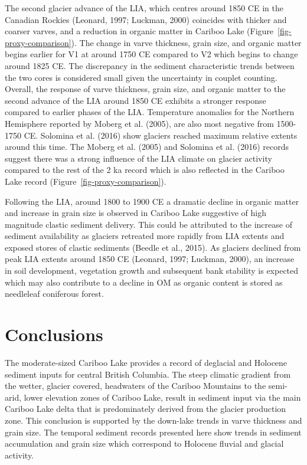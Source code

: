 \documentclass[
  letterpaper,
  DIV=11,
  numbers=noendperiod]{scrartcl}
\begin{document}
The second glacier advance of the LIA, which centres around 1850 CE in
the Canadian Rockies (Leonard, 1997; Luckman, 2000) coincides with
thicker and coarser varves, and a reduction in organic matter in Cariboo
Lake (Figure~\ref{fig-proxy-comparison}). The change in varve thickness,
grain size, and organic matter begins earlier for V1 at around 1750 CE
compared to V2 which begins to change around 1825 CE. The discrepancy in
the sediment characteristic trends between the two cores is considered
small given the uncertainty in couplet counting. Overall, the response
of varve thickness, grain size, and organic matter to the second advance
of the LIA around 1850 CE exhibits a stronger response compared to
earlier phases of the LIA. Temperature anomalies for the Northern
Hemisphere reported by Moberg et al. (2005), are also most negative from
1500-1750 CE. Solomina et al. (2016) show glaciers reached maximum
relative extents around this time. The Moberg et al. (2005) and Solomina
et al. (2016) records suggest there was a strong influence of the LIA
climate on glacier activity compared to the rest of the 2 ka record
which is also reflected in the Cariboo Lake record
(Figure~\ref{fig-proxy-comparison}).

Following the LIA, around 1800 to 1900 CE a dramatic decline in organic
matter and increase in grain size is observed in Cariboo Lake suggestive
of high magnitude clastic sediment delivery. This could be attributed to
the increase of sediment availability as glaciers retreated more rapidly
from LIA extents and exposed stores of clastic sediments (Beedle et al.,
2015). As glaciers declined from peak LIA extents around 1850 CE
(Leonard, 1997; Luckman, 2000), an increase in soil development,
vegetation growth and subsequent bank stability is expected which may
also contribute to a decline in OM as organic content is stored as
needleleaf coniferous forest.

\hypertarget{conclusions}{%
\section{Conclusions}\label{conclusions}}

The moderate-sized Cariboo Lake provides a record of deglacial and
Holocene sediment inputs for central British Columbia. The steep
climatic gradient from the wetter, glacier covered, headwaters of the
Cariboo Mountains to the semi-arid, lower elevation zones of Cariboo
Lake, result in sediment input via the main Cariboo Lake delta that is
predominately derived from the glacier production zone. This conclusion
is supported by the down-lake trends in varve thickness and grain size.
The temporal sediment records presented here show trends in sediment
accumulation and grain size which correspond to Holocene fluvial and
glacial activity.
\end{document}
